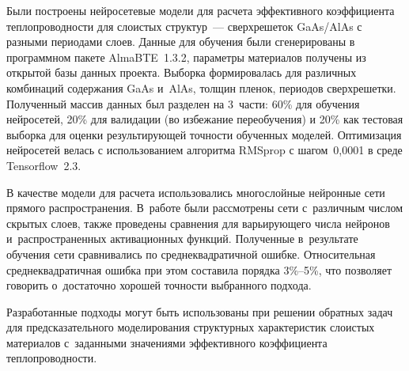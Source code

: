 \begin{multicols}{2}
    Были построены нейросетевые модели для расчета эффективного 
коэффициента теплопроводности для слоистых структур~--- сверхрешеток 
GaAs/AlAs с разными периодами слоев. Данные для обучения были 
сгенерированы в программном пакете \mbox{AlmaBTE}~1.3.2, параметры 
материалов получены из открытой базы данных проекта. Выборка 
формировалась для различных комбинаций содержания GaAs и~AlAs, толщин 
пленок, периодов сверхрешетки. Полученный массив данных был разделен на 
3~части: 60\% для обучения нейросетей, 20\% для валидации (во избежание 
переобучения) и 20\% как тестовая выборка для оценки результирующей 
точности обученных моделей. Оптимизация нейросетей велась с 
использованием алгоритма \mbox{RMSprop} с шагом~0,0001 в среде 
\mbox{Tensorflow}~2.3.
{

}
    
    В качестве модели для расчета использовались многослойные нейронные 
сети прямого распространения. В~работе были рассмотрены сети с~различным 
числом скрытых слоев, также проведены сравнения для варьирующего числа 
нейронов и~распространенных активационных функций. Полученные 
в~результате обучения сети сравнивались по среднеквадратичной ошибке. 
    Относительная среднеквадратичная ошибка при этом составила  
порядка 3\%--5\%, что позволяет говорить о~достаточно хорошей точности 
выбранного подхода.
{ %

}
    
    Разработанные подходы могут быть использованы при решении обратных 
задач для предсказательного моделирования структурных характеристик 
слоистых материалов с~заданными значениями эффективного коэффициента 
теплопроводности.
    
{\small\frenchspacing
 {%
 \begin{thebibliography}{99}
     

\end{thebibliography}}}
\end{multicols}
